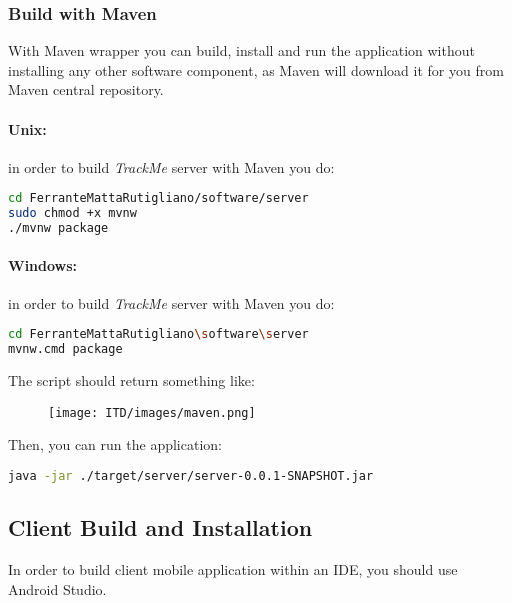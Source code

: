 \documentclass[a4paper]{article}
\begin{document}
\subsubsection{Build with Maven}
With Maven wrapper you can build, install and run the application without installing any other software component, as Maven will download it for you from Maven central repository.

\paragraph{Unix:} in order to build \textit{TrackMe} server with Maven you do:

\begin{lstlisting}[language=bash]
cd FerranteMattaRutigliano/software/server
sudo chmod +x mvnw
./mvnw package
\end{lstlisting}

\paragraph{Windows:} in order to build \textit{TrackMe} server with Maven you do:

\begin{lstlisting}[language=bash]
cd FerranteMattaRutigliano\software\server
mvnw.cmd package
\end{lstlisting}

\newpage
The script should return something like:
\begin{figure}[!htpb]
    \centering
    \texttt{[image: ITD/images/maven.png]}
\end{figure}

Then, you can run the application:

\begin{lstlisting}[language=bash]
java -jar ./target/server/server-0.0.1-SNAPSHOT.jar
\end{lstlisting}

\newpage
\subsection{Client Build and Installation}
In order to build client mobile application within an IDE, you should use Android Studio.
\end{document}
